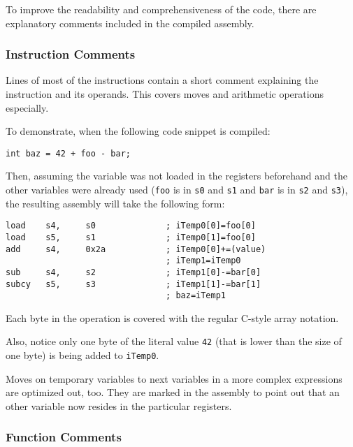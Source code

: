         To improve the readability and comprehensiveness of the code, there are explanatory comments included in the compiled assembly.

            \subsubsection{Instruction Comments}

            Lines of most of the instructions contain a short comment explaining the instruction and its operands. This covers moves and arithmetic operations especially.

            To demonstrate, when the following code snippet is compiled:

            \begin{center}\texttt{int baz = 42 + foo - bar;}\end{center}

            Then, assuming the variable was not loaded in the registers beforehand and the other variables were already used (\texttt{foo} is in \texttt{s0} and \texttt{s1} and \texttt{bar} is in \texttt{s2} and \texttt{s3}), the resulting assembly will take the following form:

            \begin{center}
\begin{verbatim}load    s4,     s0              ; iTemp0[0]=foo[0]
load    s5,     s1              ; iTemp0[1]=foo[0]
add     s4,     0x2a            ; iTemp0[0]+=(value)
                                ; iTemp1=iTemp0
sub     s4,     s2              ; iTemp1[0]-=bar[0]
subcy   s5,     s3              ; iTemp1[1]-=bar[1]
                                ; baz=iTemp1\end{verbatim}\end{center}

            Each byte in the operation is covered with the regular C-style array notation.

            Also, notice only one byte of the literal value \texttt{42} (that is lower than the size of one byte) is being added to \texttt{iTemp0}. 

            Moves on temporary variables to next variables in a more complex expressions are optimized out, too. They are marked in the assembly to point out that an other variable now resides in the particular registers.

            \subsubsection{Function Comments}

